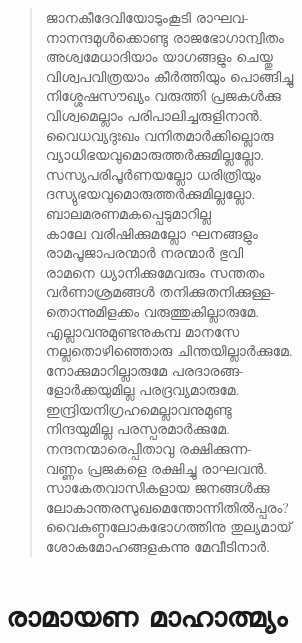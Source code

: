\begin{verse}
ജാനകീദേവിയോടുംകൂടി രാഘവ-\\
നാനന്ദമുള്‍ക്കൊണ്ടു രാജഭോഗാന്വിതം\\
അശ്വമേധാദിയാം യാഗങ്ങളും ചെയ്തു\\
വിശ്വപവിത്രയാം കീര്‍ത്തിയും പൊങ്ങിച്ചു\\
നിശ്ശേഷസൗഖ്യം വരുത്തി പ്രജകള്‍ക്കു\\
വിശ്വമെല്ലാം പരിപാലിച്ചരുളിനാന്‍.\\
വൈധവ്യദുഃഖം വനിതമാര്‍ക്കില്ലൊരു\\
വ്യാധിഭയവുമൊരുത്തര്‍ക്കുമില്ലല്ലോ.\\
സസ്യപരിപൂര്‍ണയല്ലോ ധരിത്രിയും\\
ദസ്യുഭയവുമൊരുത്തര്‍ക്കുമില്ലല്ലോ.\\
ബാലമരണമകപ്പെടുമാറില്ല\\
കാലേ വരിഷിക്കുമല്ലോ ഘനങ്ങളും\\
രാമപൂജാപരന്മാര്‍ നരന്മാര്‍ ഭുവി\\
രാമനെ ധ്യാനിക്കുമേവരും സന്തതം\\
വര്‍ണാശ്രമങ്ങള്‍ തനിക്കുതനിക്കുള്ള-\\
തൊന്നുമിളക്കം വരുത്തുകില്ലാരുമേ.\\
എല്ലാവനുമുണ്ടനുകമ്പ മാനസേ\\
നല്ലതൊഴിഞ്ഞൊരു ചിന്തയില്ലാര്‍ക്കുമേ.\\
നോക്കുമാറില്ലാരുമേ പരദാരങ്ങ-\\
ളോര്‍ക്കയുമില്ല പരദ്രവ്യമാരുമേ.\\
ഇന്ദ്രിയനിഗ്രഹമെല്ലാവനുമുണ്ടു\\
നിന്ദയുമില്ല പരസ്പരമാര്‍ക്കുമേ.\\
നന്ദനന്മാരെപ്പിതാവു രക്ഷിക്കുന്ന-\\
വണ്ണം പ്രജകളെ രക്ഷിച്ചു രാഘവന്‍.\\
സാകേതവാസികളായ ജനങ്ങള്‍ക്കു\\
ലോകാന്തരസുഖമെന്തോന്നിതില്‍പ്പരം?\\
വൈകുണ്ഠലോകഭോഗത്തിനു തുല്യമായ്\\
ശോകമോഹങ്ങളകന്നു മേവീടിനാര്‍.
\end{verse}
\bigskip


\section{രാമായണ മാഹാത്മ്യം}


